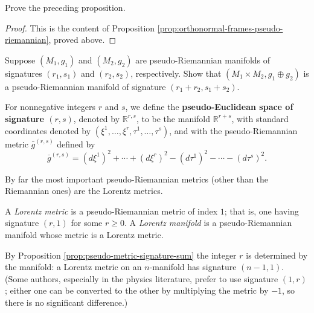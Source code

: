 \begin{exercise}
\label{exer:prove-orthonormal-frames}
\leanok
{}
Prove the preceding proposition.
\end{exercise}

\begin{proof}
\leanok
{}
This is the content of Proposition \ref{prop:orthonormal-frames-pseudo-riemannian}, proved above.
\end{proof}

\begin{exercise}
\label{exer:product-pseudo-riemannian}

Suppose $(M_1, g_1)$ and $(M_2, g_2)$ are pseudo-Riemannian manifolds of signatures $(r_1, s_1)$ and $(r_2, s_2)$, respectively. Show that $(M_1 \times M_2, g_1 \oplus g_2)$ is a pseudo-Riemannian manifold of signature $(r_1 + r_2, s_1 + s_2)$.
\end{exercise}

For nonnegative integers $r$ and $s$, we define the \textbf{pseudo-Euclidean space of signature $(r,s)$}, denoted by $\mathbb{R}^{r,s}$, to be the manifold $\mathbb{R}^{r+s}$, with standard coordinates denoted by $(\xi^1, \ldots, \xi^r, \tau^1, \ldots, \tau^s)$, and with the pseudo-Riemannian metric $\bar{g}^{(r,s)}$ defined by
\begin{equation}
\bar{g}^{(r,s)} = (d\xi^1)^2 + \cdots + (d\xi^r)^2 - (d\tau^1)^2 - \cdots - (d\tau^s)^2.
\tag{2.24}
\end{equation}

By far the most important pseudo-Riemannian metrics (other than the Riemannian ones) are the Lorentz metrics.

\begin{definition}
\label{def:lorentz-metric}
\leanok
{}
A \emph{Lorentz metric} is a pseudo-Riemannian metric of index $1$; that is, one having signature $(r,1)$ for some $r \geq 0$. A \emph{Lorentz manifold} is a pseudo-Riemannian manifold whose metric is a Lorentz metric.
\end{definition}

By Proposition \ref{prop:pseudo-metric-signature-sum} the integer $r$ is determined by the manifold: a Lorentz metric on an $n$-manifold has signature $(n-1,1)$. (Some authors, especially in the physics literature, prefer to use signature $(1, r)$; either one can be converted to the other by multiplying the metric by $-1$, so there is no significant difference.)

